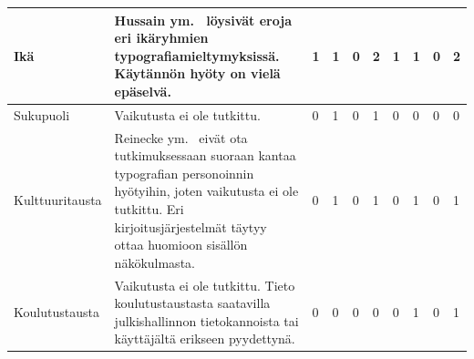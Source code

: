 \documentclass[finnish, 12pt, a4paper, elec, utf8, a-1b, online]{aaltothesis}
\begin{document}
{\begin{longtable}{p{2.5cm}|p{6cm}|p{0.5cm}p{0.5cm}p{0.5cm}|p{0.5cm}|p{0.5cm}p{0.5cm}p{0.5cm}|p{0.5cm}|}
        \midrule
        Ikä                                    & Hussain ym.~\cite{hussain_sohaib_ahmed_qasim_khan_2011} löysivät eroja eri ikäryhmien typografiamieltymyksissä. Käytännön hyöty on vielä epäselvä.                                                                                                            & 1                                          & 1                                   & 0                                      & 2                            & 1                                               & 1                                         & 0                                         & 2                            \\
        \midrule
        Sukupuoli                              & Vaikutusta ei ole tutkittu.                                                                                                                                                                                                                                   & 0                                          & 1                                   & 0                                      & 1                            & 0                                               & 0                                         & 0                                         & 0                            \\
        \midrule
        Kulttuuritausta                        & Reinecke ym.~\cite{10.1145/2556288.2557052} eivät ota tutkimuksessaan suoraan kantaa typografian personoinnin hyötyihin, joten vaikutusta ei ole tutkittu. Eri kirjoitusjärjestelmät täytyy ottaa huomioon sisällön näkökulmasta.                             & 0                                          & 1                                   & 0                                      & 1                            & 0                                               & 1                                         & 0                                         & 1                            \\
        \midrule
        Koulutustausta                         & Vaikutusta ei ole tutkittu. Tieto koulutustaustasta saatavilla julkishallinnon tietokannoista tai käyttäjältä erikseen pyydettynä.                                                                                                                            & 0                                          & 0                                   & 0                                      & 0                            & 0                                               & 1                                         & 0                                         & 1                            \\

\end{longtable}}
\end{document}
